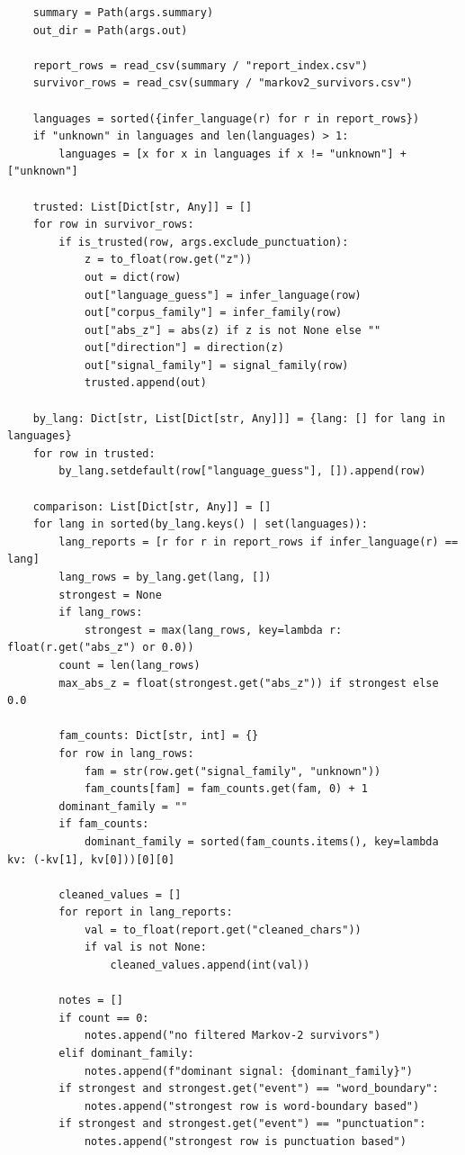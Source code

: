 \documentclass[11pt,a4paper]{article}
\begin{document}
\begin{lstlisting}
    summary = Path(args.summary)
    out_dir = Path(args.out)

    report_rows = read_csv(summary / "report_index.csv")
    survivor_rows = read_csv(summary / "markov2_survivors.csv")

    languages = sorted({infer_language(r) for r in report_rows})
    if "unknown" in languages and len(languages) > 1:
        languages = [x for x in languages if x != "unknown"] + ["unknown"]

    trusted: List[Dict[str, Any]] = []
    for row in survivor_rows:
        if is_trusted(row, args.exclude_punctuation):
            z = to_float(row.get("z"))
            out = dict(row)
            out["language_guess"] = infer_language(row)
            out["corpus_family"] = infer_family(row)
            out["abs_z"] = abs(z) if z is not None else ""
            out["direction"] = direction(z)
            out["signal_family"] = signal_family(row)
            trusted.append(out)

    by_lang: Dict[str, List[Dict[str, Any]]] = {lang: [] for lang in languages}
    for row in trusted:
        by_lang.setdefault(row["language_guess"], []).append(row)

    comparison: List[Dict[str, Any]] = []
    for lang in sorted(by_lang.keys() | set(languages)):
        lang_reports = [r for r in report_rows if infer_language(r) == lang]
        lang_rows = by_lang.get(lang, [])
        strongest = None
        if lang_rows:
            strongest = max(lang_rows, key=lambda r: float(r.get("abs_z") or 0.0))
        count = len(lang_rows)
        max_abs_z = float(strongest.get("abs_z")) if strongest else 0.0

        fam_counts: Dict[str, int] = {}
        for row in lang_rows:
            fam = str(row.get("signal_family", "unknown"))
            fam_counts[fam] = fam_counts.get(fam, 0) + 1
        dominant_family = ""
        if fam_counts:
            dominant_family = sorted(fam_counts.items(), key=lambda kv: (-kv[1], kv[0]))[0][0]

        cleaned_values = []
        for report in lang_reports:
            val = to_float(report.get("cleaned_chars"))
            if val is not None:
                cleaned_values.append(int(val))

        notes = []
        if count == 0:
            notes.append("no filtered Markov-2 survivors")
        elif dominant_family:
            notes.append(f"dominant signal: {dominant_family}")
        if strongest and strongest.get("event") == "word_boundary":
            notes.append("strongest row is word-boundary based")
        if strongest and strongest.get("event") == "punctuation":
            notes.append("strongest row is punctuation based")


\end{lstlisting}
\end{document}

